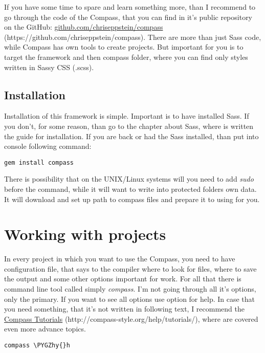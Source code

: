 \documentclass[a4paper,12pt,oneside]{sphinxmanual}
\def\PYGZhy{\char`\-}
\begin{document}
If you have some time to spare and learn something more, than I recommend to go through the code of the Compass, that you can find in it's public repository on the GitHub: \href{https://github.com/chriseppstein/compass}{github.com/chriseppstein/compass} (https://github.com/chriseppstein/compass). There are more than just Sass code, while Compass has own tools to create projects. But important for you is to target the framework and then compass folder, where you can find only styles written in Sassy CSS (.scss).


\section{Installation}
\label{src/compass_basics:installation}
Installation of this framework is simple. Important is to have installed Sass. If you don't, for some reason, than go to the chapter about Sass, where is written the guide for installation. If you are back or had the Sass installed, than put into console following command:

\begin{Verbatim}[commandchars=\\\{\}]
gem install compass
\end{Verbatim}

There is possibility that on the UNIX/Linux systems will you need to add \emph{sudo} before the command, while it will want to write into protected folders own data. It will download and set up path to compass files and prepare it to using for you.


\chapter{Working with projects}
\label{src/working_with_projects:working-with-projects}\label{src/working_with_projects::doc}
In every project in which you want to use the Compass, you need to have configuration file, that says to the compiler where to look for files, where to save the output and some other options important for work. For all that there is command line tool called simply \emph{compass}. I'm not going through all it's options, only the primary. If you want to see all options use option for help. In case that you need something, that it's not written in following text, I recommend the \href{http://compass-style.org/help/tutorials/}{Compass Tutorials} (http://compass-style.org/help/tutorials/), where are covered even more advance topics.

\begin{Verbatim}[commandchars=\\\{\}]
compass \PYGZhy{}h
\end{Verbatim}
\end{document}
